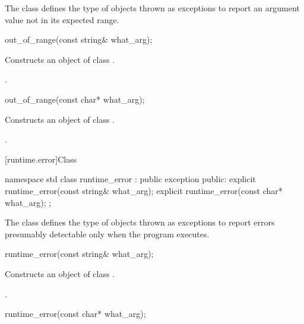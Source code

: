 \pnum
The class
defines the type of objects thrown as exceptions to report an
argument value not in its expected range.

%
\begin{itemdecl}
out_of_range(const string& what_arg);
\end{itemdecl}

\begin{itemdescr}
\pnum
\effects
Constructs an object of class
.

\pnum
\postcondition
{}.
\end{itemdescr}

%
\begin{itemdecl}
out_of_range(const char* what_arg);
\end{itemdecl}

\begin{itemdescr}
\pnum
\effects
Constructs an object of class
.

\pnum
\postcondition
{}.
\end{itemdescr}

[runtime.error]{Class }

%
\begin{codeblock}
namespace std {
  class runtime_error : public exception {
  public:
    explicit runtime_error(const string& what_arg);
    explicit runtime_error(const char* what_arg);
  };
}
\end{codeblock}

\pnum
The class
defines the type of objects thrown as exceptions to report errors presumably detectable only
when the program executes.

%
\begin{itemdecl}
runtime_error(const string& what_arg);
\end{itemdecl}

\begin{itemdescr}
\pnum
\effects
Constructs an object of class
.

\pnum
\postcondition
{}.
\end{itemdescr}

%
\begin{itemdecl}
runtime_error(const char* what_arg);
\end{itemdecl}

